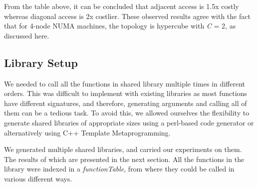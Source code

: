 From the table above, it can be concluded that adjacent access is 1.5x costly whereas diagonal access is
2x costlier. These observed results agree with the fact that for 4-node NUMA machines, the topology is
hypercube with \textit{C} = 2, as discussed here\cite{Drepper07whatevery}.

\subsection{Library Setup}
We needed to call all the functions in shared library multiple times in different orders. This was difficult
to implement with existing libraries as most functions have different signatures, and therefore, generating
arguments and calling all of them can be a tedious task. To avoid this, we allowed ourselves the flexibility
to generate shared libraries of appropriate sizes using a perl-based code generator or alternatively using
C++ Template Metaprogramming.\cite{templateMeta}

We generated multiple shared libraries, and carried our experiments on them. The results of which are presented
in the next section. All the functions in the library were indexed in a \textit{functionTable}, from where they
could be called in various different ways.
